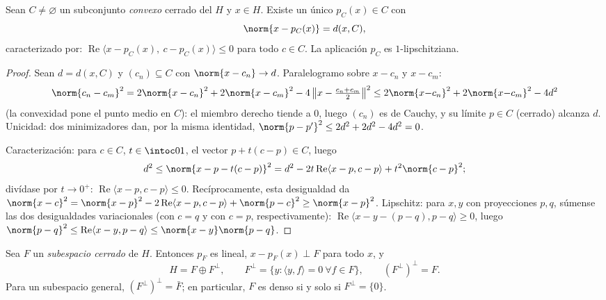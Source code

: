 \begin{theorem}
\label{thm:b3:hilbert:projection}
Sean $C \neq \varnothing$ un subconjunto \emph{convexo} cerrado del
 $H$ y $x \in H$.
Existe un único $p_C(x)
\in C$ con
\[
\norm{x - p_C(x)} = d(x, C),
\]
caracterizado por: $\operatorname{Re}\langle x - p_C(x),\ c -
p_C(x)\rangle \leq 0$ para todo $c \in C$. La aplicación $p_C$ es
$1$-lipschitziana.
\end{theorem}

\begin{proof}
Sean $d = d(x, C)$ y $(c_n) \subseteq C$ con $\norm{x - c_n}
\to d$. Paralelogramo sobre $x - c_n$ y $x - c_m$:
\[
\norm{c_n - c_m}^2 = 2\norm{x - c_n}^2 + 2\norm{x - c_m}^2 -
4\,\bigl\|x - \tfrac{c_n + c_m}2\bigr\|^2
\leq 2\norm{x{-}c_n}^2 + 2\norm{x{-}c_m}^2 - 4d^2
\]
(la convexidad pone el punto medio en $C$): el miembro derecho tiende a
$0$, luego $(c_n)$ es de Cauchy, y su límite $p \in C$ (cerrado) alcanza
$d$. Unicidad: dos minimizadores dan, por la misma identidad,
$\norm{p - p'}^2 \leq 2d^2 + 2d^2 - 4d^2 = 0$.

Caracterización: para $c \in C$, $t \in \intoc01$, el vector
$p + t(c - p) \in C$, luego
\[
d^2 \leq \norm{x - p - t(c-p)}^2
= d^2 - 2t\operatorname{Re}\langle x - p, c - p\rangle +
t^2\norm{c-p}^2 ;
\]
divídase por $t \to 0^+$: $\operatorname{Re}\langle x - p, c -
p\rangle \leq 0$. Recíprocamente, esta desigualdad da $\norm{x -
c}^2 = \norm{x - p}^2 - 2\operatorname{Re}\langle x - p, c -
p\rangle + \norm{p - c}^2 \geq \norm{x-p}^2$. Lipschitz: para $x, y$ con
proyecciones $p, q$, súmense las dos desigualdades variacionales (con
$c = q$ y con $c = p$, respectivamente):
$\operatorname{Re}\langle x - y - (p - q), p - q\rangle \geq
0$, luego $\norm{p - q}^2 \leq \operatorname{Re}\langle x - y, p -
q\rangle \leq \norm{x - y}\norm{p - q}$.
\end{proof}

\begin{theorem}
\label{thm:b3:hilbert:decomposition}
Sea $F$ un \emph{subespacio cerrado} de $H$. Entonces $p_F$ es lineal,
$x - p_F(x) \perp F$ para todo $x$, y
\[
H = F \oplus F^\perp,
\qquad F^\perp = \{y : \langle y, f\rangle = 0\ \forall f\in
F\},
\qquad (F^\perp)^\perp = F .
\]
Para un subespacio general, $(F^\perp)^\perp = \bar F$; en particular,
$F$ es denso si y solo si $F^\perp = \{0\}$.
\end{theorem}

